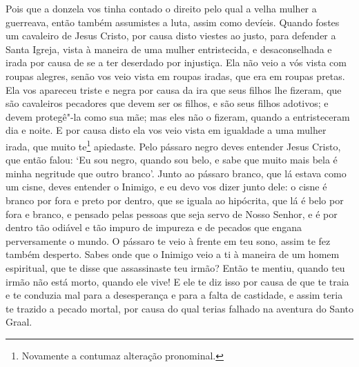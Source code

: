 Pois que a donzela vos tinha contado o direito pelo qual a velha mulher a
guerreava, então também assumistes a luta, assim como devíeis. Quando fostes um
cavaleiro de Jesus Cristo, por causa disto viestes ao justo, para defender a
Santa Igreja, vista à maneira de uma mulher entristecida, e desaconselhada e
irada por causa de se a ter deserdado por injustiça. Ela não veio a vós vista
com roupas alegres, senão vos veio vista em roupas iradas, que era em roupas
pretas. Ela vos apareceu triste e negra por causa da ira que seus filhos lhe
fizeram, que são cavaleiros pecadores que devem ser os filhos, e são seus
filhos adotivos; e devem protegê"-la como sua mãe; mas eles não o fizeram,
quando a entristeceram dia e noite. E por causa disto ela vos veio
vista em igualdade a uma mulher irada, que muito te\footnote{ Novamente a
contumaz alteração pronominal. } apiedaste. Pelo pássaro negro deves
entender Jesus Cristo, que então falou: ‘Eu sou negro, quando sou belo, e sabe
que muito mais bela é minha negritude que outro branco’. Junto ao pássaro branco,
que lá estava como um cisne, deves entender o Inimigo, e eu devo vos dizer
junto dele: o cisne é branco por fora e preto por dentro, que se iguala ao
hipócrita, que lá é belo por fora e branco, e pensado pelas pessoas que seja
servo de Nosso Senhor, e é por dentro tão odiável e tão impuro  de impureza e
de pecados que engana perversamente o mundo. O pássaro te veio à frente em teu
sono, assim te fez também desperto. Sabes onde que o Inimigo veio a ti à
maneira de um homem espiritual, que te disse que assassinaste teu irmão? Então
te mentiu, quando teu irmão não está morto, quando ele vive! E ele te diz isso
por causa de que te traia e te conduzia mal para a desesperança e para a falta
de castidade, e assim teria te trazido a pecado mortal, por causa do qual
terias falhado na aventura do Santo Graal.  

